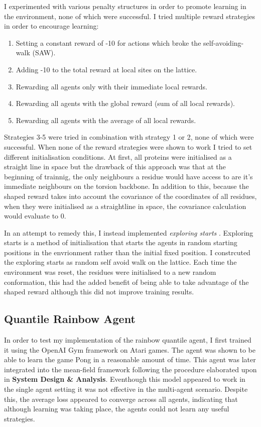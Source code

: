 I experimented with various penalty structures in order to
promote learning in the environment, none of which were successful.
I tried multiple reward strategies in order to encourage learning:
\begin{enumerate}
    \item Setting a constant reward of -10 for actions
    which broke the self-avoiding-walk (SAW).
    \item Adding -10 to the total reward at local sites on the lattice.
    \item Rewarding all agents only with their immediate local rewards.
    \item Rewarding all agents with the global reward (sum of all local rewards).
    \item Rewarding all agents with the average of all local rewards.
\end{enumerate}
Strategies 3-5 were tried in combination with strategy 1 or 2, none of which
were successful. When none of the reward strategies were shown to work
I tried to set different initialisation conditions. At first,
all proteins were initialised as a straight line in space but
the drawback of this approach was that at the beginning of trainnig,
the only neighbours a residue would have access to are it's immediate
neighbours on the torsion backbone. In addition to this,
because the shaped reward takes into account the
covariance of the coordinates of all residues, when they
were initialised as a straightline in space, the covariance
calculation would evaluate to 0.

In an attempt to remedy this, I instead implemented
\emph{exploring starts} \cite{sutton2018reinforcement}. Exploring
starts is a method of initialisation that starts the agents in
random starting positions in the envrionment rather than the initial
fixed position. I constrcuted the exploring starts as random self
avoid walk on the lattice. Each time the environment was reset,
the residues were initialised to a new random conformation,
this had the added benefit of being able to take advantage of the 
shaped reward although this did not improve training results.


\subsection{Quantile Rainbow Agent}
In order to test my implementation of the rainbow quantile
agent, I first trained it using the OpenAI Gym framework
on Atari games. The agent was shown to be able to learn
the game Pong in a reasonable amount of time. This
agent was later integrated into the mean-field framework
following the procedure elaborated upon in \textbf{System Design \& Analysis}.
Eventhough this model appeared to work in the single agent
setting it was not effective in the multi-agent scenario.
Despite this, the average loss appeared to converge across
all agents, indicating that although learning was taking place,
the agents could not learn any useful strategies.

